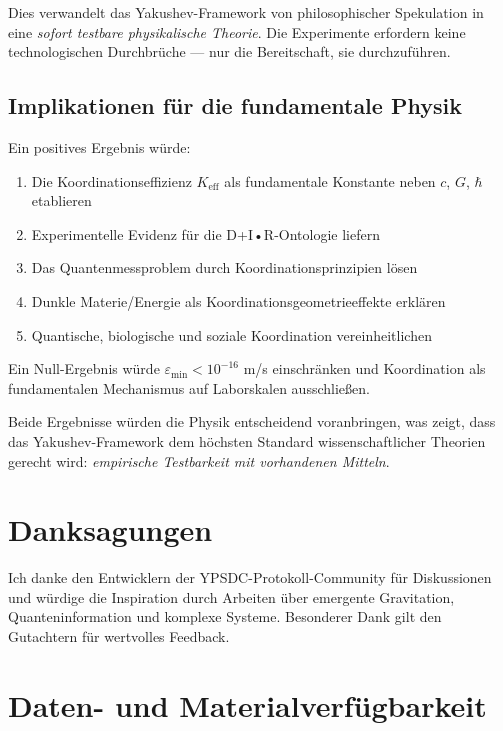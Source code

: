 \documentclass[11pt,a4paper]{article}
\begin{document}
	Dies verwandelt das Yakushev-Framework von philosophischer Spekulation in eine \emph{sofort testbare physikalische Theorie}. Die Experimente erfordern keine technologischen Durchbrüche — nur die Bereitschaft, sie durchzuführen.
	
	\subsection{Implikationen für die fundamentale Physik}
	
	Ein positives Ergebnis würde:
	\begin{enumerate}
		\item Die Koordinationseffizienz $K_{\mathrm{eff}}$ als fundamentale Konstante neben $c$, $G$, $\hbar$ etablieren
		\item Experimentelle Evidenz für die D+I•R-Ontologie liefern
		\item Das Quantenmessproblem durch Koordinationsprinzipien lösen
		\item Dunkle Materie/Energie als Koordinationsgeometrieeffekte erklären
		\item Quantische, biologische und soziale Koordination vereinheitlichen
	\end{enumerate}
	
	Ein Null-Ergebnis würde $\varepsilon_{\min} < 10^{-16}$ m/s einschränken und Koordination als fundamentalen Mechanismus auf Laborskalen ausschließen.
	
	Beide Ergebnisse würden die Physik entscheidend voranbringen, was zeigt, dass das Yakushev-Framework dem höchsten Standard wissenschaftlicher Theorien gerecht wird: \emph{empirische Testbarkeit mit vorhandenen Mitteln}.
	
	\section*{Danksagungen}
	Ich danke den Entwicklern der YPSDC-Protokoll-Community für Diskussionen und würdige die Inspiration durch Arbeiten über emergente Gravitation, Quanteninformation und komplexe Systeme. Besonderer Dank gilt den Gutachtern für wertvolles Feedback.
	
	\section*{Daten- und Materialverfügbarkeit}
	
\end{document}
